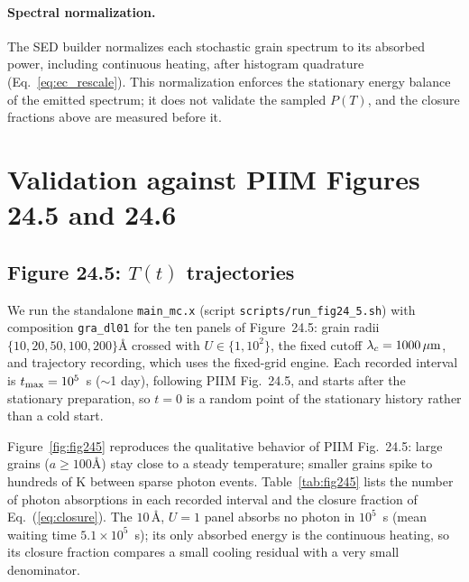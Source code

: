 \documentclass{my_memo}
\newcommand{\umc}{\,\mu{\rm m}}
\begin{document}
\paragraph{Spectral normalization.} The SED builder normalizes each
stochastic grain spectrum to its absorbed power, including continuous
heating, after histogram quadrature (Eq.~\ref{eq:ec_rescale}). This
normalization enforces the stationary energy balance of the emitted
spectrum; it does not validate the sampled $P(T)$, and the closure
fractions above are measured before it.

\section{Validation against PIIM Figures 24.5 and 24.6}\label{sec:valid}

\subsection{Figure 24.5: $T(t)$ trajectories}

We run the standalone \verb|main_mc.x| (script
\verb|scripts/run_fig24_5.sh|) with composition \texttt{gra\_dl01} for
the ten panels of \citet{DrainePIIM2011} Figure~24.5: grain radii
$\{10,20,50,100,200\}$\AA{} crossed with $U\in\{1,10^2\}$, the fixed
cutoff $\lambda_c=1000\umc$, and trajectory recording, which uses the
fixed-grid engine. Each recorded interval is $t_{\rm max}=10^5$~s
($\sim$1 day), following PIIM Fig.~24.5, and starts after the
stationary preparation, so $t=0$ is a random point of the stationary
history rather than a cold start.

Figure~\ref{fig:fig245} reproduces the qualitative behavior of PIIM
Fig.~24.5: large grains ($a\geq 100$\AA) stay close to a steady
temperature; smaller grains spike to hundreds of K between sparse
photon events. Table~\ref{tab:fig245} lists the number of photon
absorptions in each recorded interval and the closure fraction of
Eq.~(\ref{eq:closure}). The $10\,\textrm{\AA}$, $U=1$ panel absorbs
no photon in $10^5$~s (mean waiting time $5.1\times10^5$~s); its only
absorbed energy is the continuous heating, so its closure fraction
compares a small cooling residual with a very small denominator.
\end{document}
